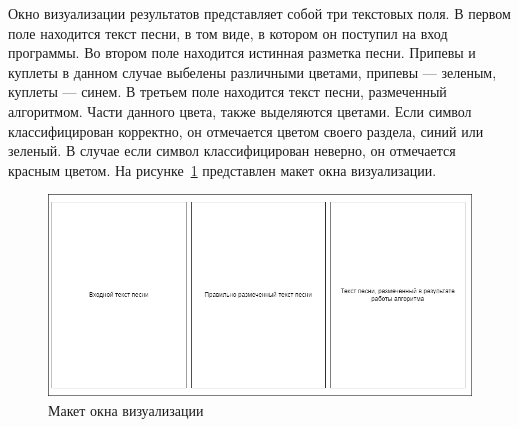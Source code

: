 Окно визуализации результатов представляет собой три текстовых поля. В первом поле находится текст песни, в том виде, в котором он поступил на вход программы. Во втором поле находится истинная разметка песни. Припевы и куплеты в данном случае выбелены различными цветами, припевы — зеленым, куплеты — синем. В третьем поле находится текст песни, размеченный алгоритмом. Части данного цвета, также выделяются цветами. Если символ классифицирован корректно, он отмечается цветом своего раздела, синий или зеленый. В случае если символ классифицирован неверно, он отмечается красным цветом. На рисунке~\ref{fig:Визуализация} представлен макет окна визуализации.

\begin{figure}
    \centering
    \includegraphics[width=1\linewidth]{pictures/Визуализация.png}
    \caption{Макет окна визуализации}
    \label{fig:Визуализация}
\end{figure}